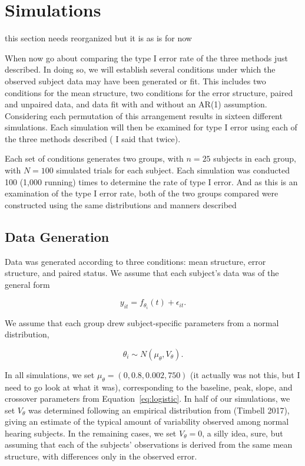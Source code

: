 \documentclass{article}
\begin{document}
\section{Simulations}

this section needs reorganized but it is as is for now

When now go about comparing the type I error rate of the three methods just described. In doing so, we will establish several conditions under which the observed subject data may have been generated or fit. This includes two conditions for the mean structure, two conditions for the error structure, paired and unpaired data, and data fit with and without an AR(1) assumption. Considering each permutation of this arrangement results in sixteen different simulations. Each simulation will then be examined for type I error using each of the three methods described ( I said that twice). 

Each set of conditions generates two groups, with $n = 25$ subjects in each group, with $N = 100$ simulated trials for each subject. Each simulation was conducted 100 (1,000 running) times to determine the rate of type I error. And as this is an examination of the type I error rate, both of the two groups compared were constructed using the same distributions and manners described


\subsection{Data Generation}

Data was generated according to three conditions: mean structure, error structure, and paired status. We assume that each subject's data was of the general form 

\begin{equation}\label{eq:sm_f_general}
y_{it} = f_{\theta_i}(t) + \epsilon_{it}.
\end{equation}

We assume that each group drew subject-specific parameters from a normal distribution, 

\begin{equation}
\theta_i \sim N(\mu_{\theta}, V_{\theta}).
\end{equation}

In all simulations, we set $\mu_{\theta} = (0,0.8, 0.002, 750)$ (it actually was not this, but I need to go look at what it was), corresponding to the baseline, peak, slope, and crossover parameters from Equation~\ref{eq:logistic}. In half of our simulations, we set $V_{\theta}$ was determined following an empirical distribution from (Timbell 2017), giving an estimate of the typical amount of variability observed among normal hearing subjects. In the remaining cases, we set $V_{\theta} = 0$, a silly idea, sure, but assuming that each of the subjects' observations is derived from the same mean structure, with differences only in the observed error. 
\end{document}
